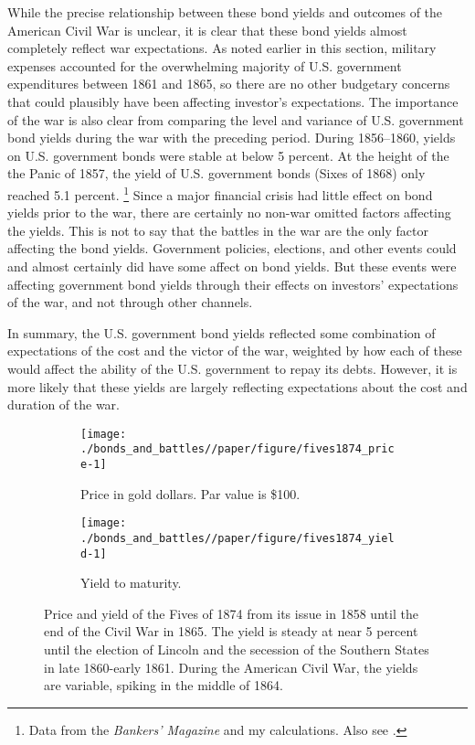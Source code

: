 
While the precise relationship between these bond yields and outcomes of the American Civil War is unclear, it is clear that these bond yields almost completely reflect war expectations.
As noted earlier in this section, military expenses accounted for the overwhelming majority of U.S. government expenditures between 1861 and 1865, so there are no other budgetary concerns that could plausibly have been affecting investor's expectations.
The importance of the war is also clear from comparing the level and variance of U.S. government bond yields during the war with the preceding period.
During 1856--1860, yields on U.S. government bonds were stable at below 5 percent.
At the height of the the Panic of 1857, the yield of U.S. government bonds (Sixes of 1868) only reached 5.1 percent.%
\footnote{Data from the \textit{Bankers' Magazine} and my calculations. Also see \textcite{HomerSylla2005}.}
Since a major financial crisis had little effect on bond yields prior to the war, there are certainly no non-war omitted factors affecting the yields.
This is not to say that the battles in the war are the only factor affecting the bond yields.
Government policies, elections, and other events could and almost certainly did have some affect on bond yields.
But these events were affecting government bond yields through their effects on investors' expectations of the war, and not through other channels.

In summary, the U.S. government bond yields reflected some combination of expectations of the cost and the victor of the war, weighted by how each of these would affect the ability of the U.S. government to repay its debts.
However, it is more likely that these yields are largely reflecting expectations about the cost and duration of the war.

\begin{figure}[!htpb]
  \centering
  \begin{subfigure}[t]{\linewidth}
   \texttt{[image: ./bonds\_and\_battles//paper/figure/fives1874\_price-1]}
  \caption{Price in gold dollars. Par value is \$100.}
  \label{bonds:fig:fives1874_price}
\end{subfigure}
\begin{subfigure}[t]{\linewidth}
   \texttt{[image: ./bonds\_and\_battles//paper/figure/fives1874\_yield-1]}
  \caption{Yield to maturity.}
  \label{bonds:fig:fives1874_yield}
\end{subfigure}
\caption[Price and yield of the Fives of 1874 from its issue in 1858 until the end of the Civil War in 1865]{Price and yield of the Fives of 1874 from its issue in 1858 until the end of the Civil War in 1865.
The yield is steady at near 5 percent until the election of Lincoln and the secession of the Southern States in late 1860-early 1861.
During the American Civil War, the yields are variable, spiking in the middle of 1864.
 }
\label{bonds:fig:fives1874_yield_price}
\end{figure}

